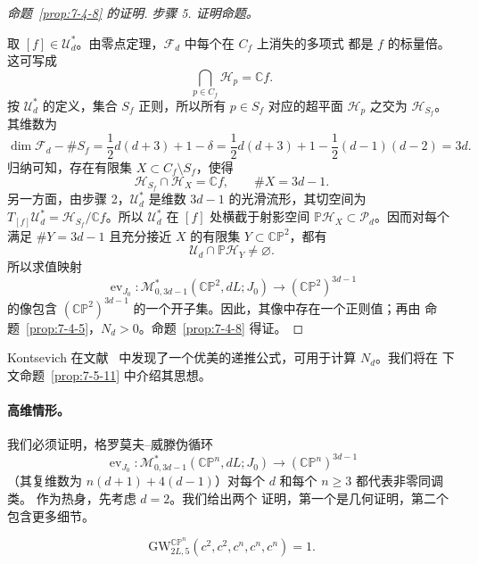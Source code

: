 \begin{proof}[命题~\ref{prop:7-4-8} 的证明]
\emph{步骤 5. 证明命题。}

取 $[f]\in\mathcal U_d^*$。由零点定理，$\mathcal F_d$ 中每个在 $C_f$ 上消失的多项式
都是 $f$ 的标量倍。这可写成
\[
  \bigcap_{p\in C_f}\mathcal H_p=\mathbb C f.
\]
按 $\mathcal U_d^*$ 的定义，集合 $S_f$ 正则，所以所有 $p\in S_f$ 对应的超平面
$\mathcal H_p$ 之交为 $\mathcal H_{S_f}$。其维数为
\[
  \dim\mathcal F_d-\#S_f
  =\frac12d(d+3)+1-\delta
  =\frac12d(d+3)+1-\frac12(d-1)(d-2)
  =3d.
\]
归纳可知，存在有限集 $X\subset C_f\setminus S_f$，使得
\[
  \mathcal H_{S_f}\cap\mathcal H_X=\mathbb C f,
  \qquad \#X=3d-1.
\]
另一方面，由步骤 2，$\mathcal U_d^*$ 是维数 $3d-1$ 的光滑流形，其切空间为
$T_{[f]}\mathcal U_d^*=\mathcal H_{S_f}/\mathbb C f$。所以
$\mathcal U_d^*$ 在 $[f]$ 处横截于射影空间
$\mathbb P\mathcal H_X\subset\mathcal P_d$。因而对每个满足 $\#Y=3d-1$ 且充分接近
$X$ 的有限集 $Y\subset\mathbb{CP}^2$，都有
\[
  \mathcal U_d\cap\mathbb P\mathcal H_Y\ne\varnothing.
\]
所以求值映射
\[
  \operatorname{ev}_{J_0}:
  \mathcal M^*_{0,3d-1}(\mathbb{CP}^2,dL;J_0)
  \longrightarrow(\mathbb{CP}^2)^{3d-1}
\]
的像包含 $(\mathbb{CP}^2)^{3d-1}$ 的一个开子集。因此，其像中存在一个正则值；再由
命题~\ref{prop:7-4-5}，$N_d>0$。命题~\ref{prop:7-4-8} 得证。
\end{proof}

Kontsevich 在文献~ 中发现了一个优美的递推公式，可用于计算 $N_d$。我们将在
下文命题~\ref{prop:7-5-11} 中介绍其思想。

\paragraph{高维情形。}
我们必须证明，格罗莫夫--威滕伪循环
\[
  \operatorname{ev}_{J_0}:
  \mathcal M^*_{0,3d-1}(\mathbb{CP}^n,dL;J_0)
  \longrightarrow(\mathbb{CP}^n)^{3d-1}
\]
（其复维数为 $n(d+1)+4(d-1)$）对每个 $d$ 和每个 $n\ge3$ 都代表非零同调类。
作为热身，先考虑 $d=2$。我们给出两个
证明，第一个是几何证明，第二个包含更多细节。

\begin{proposition}\label{prop:7-4-9}
\begin{equation}\label{eq:7-4-7}
  \mathrm{GW}^{\mathbb{CP}^n}_{2L,5}(c^2,c^2,c^n,c^n,c^n)=1.
\end{equation}
\end{proposition}

